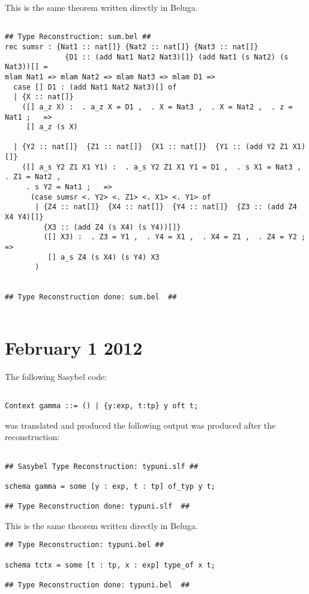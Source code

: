 \documentclass[12pt]{article}
\begin{document}
This is the same theorem written directly in \textmd{Beluga}.
\footnotesize\begin{verbatim}

## Type Reconstruction: sum.bel ##
rec sumsr : {Nat1 :: nat[]} {Nat2 :: nat[]} {Nat3 :: nat[]}
              {D1 :: (add Nat1 Nat2 Nat3)[]} (add Nat1 (s Nat2) (s Nat3))[] = 
mlam Nat1 => mlam Nat2 => mlam Nat3 => mlam D1 => 
  case [] D1 : (add Nat1 Nat2 Nat3)[] of 
  | {X :: nat[]}
    ([] a_z X) :  . a_z X = D1 ,  . X = Nat3 ,  . X = Nat2 ,  . z = Nat1 ;   => 
     [] a_z (s X)
  
  | {Y2 :: nat[]}  {Z1 :: nat[]}  {X1 :: nat[]}  {Y1 :: (add Y2 Z1 X1)[]}
    ([] a_s Y2 Z1 X1 Y1) :  . a_s Y2 Z1 X1 Y1 = D1 ,  . s X1 = Nat3 ,  . Z1 = Nat2 ,
     . s Y2 = Nat1 ;   => 
      (case sumsr <. Y2> <. Z1> <. X1> <. Y1> of 
       | {Z4 :: nat[]}  {X4 :: nat[]}  {Y4 :: nat[]}  {Z3 :: (add Z4 X4 Y4)[]} 
         {X3 :: (add Z4 (s X4) (s Y4))[]}
         ([] X3) :  . Z3 = Y1 ,  . Y4 = X1 ,  . X4 = Z1 ,  . Z4 = Y2 ;   => 
          [] a_s Z4 (s X4) (s Y4) X3
       )
  

## Type Reconstruction done: sum.bel  ##


\end{verbatim}

\section{February 1 2012}
The following \textmd{Sasybel} code:
\footnotesize\begin{verbatim}

Context gamma ::= () | {y:exp, t:tp} y oft t;

\end{verbatim}
was translated and produced the following output was produced after the reconstruction:
\footnotesize\begin{verbatim}

## Sasybel Type Reconstruction: typuni.slf ##

schema gamma = some [y : exp, t : tp] of_typ y t;

## Type Reconstruction done: typuni.slf  ##

\end{verbatim}
This is the same theorem written directly in \textmd{Beluga}.
\footnotesize\begin{verbatim}
## Type Reconstruction: typuni.bel ##

schema tctx = some [t : tp, x : exp] type_of x t;

## Type Reconstruction done: typuni.bel  ##

\end{verbatim}
\end{document}
